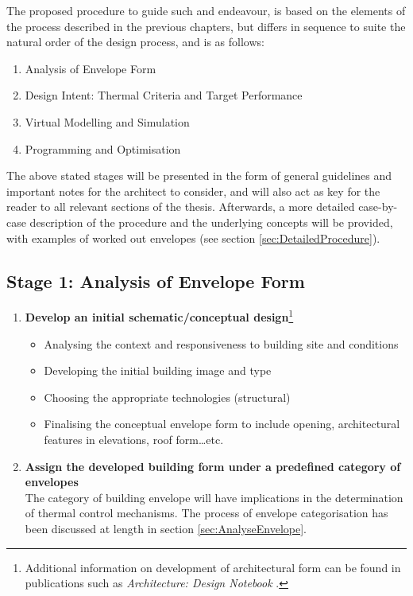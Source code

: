 The proposed procedure to guide such and endeavour, is based on the elements of the process described in the previous chapters, but differs in sequence to suite the natural order of the design process, and is as follows:

\begin{enumerate}
	\item Analysis of Envelope Form
	\item Design Intent: Thermal Criteria and Target Performance
	\item Virtual Modelling and Simulation
	\item Programming and Optimisation
\end{enumerate}

The above stated stages will be presented in the form of general guidelines and important notes for the architect to consider, and will also act as key for the reader to all relevant sections of the thesis. Afterwards, a more detailed case-by-case description of the procedure and the underlying concepts will be provided, with examples of worked out envelopes (see section \ref{sec:DetailedProcedure}).

\clearpage
\subsection{Stage 1: Analysis of Envelope Form}
\label{sec:Stage1}

\vspace{0.5cm}
\begin{enumerate}
	\item \textbf{Develop an initial schematic/conceptual design}\footnote{Additional information on development of architectural form can be found in publications such as \emph{Architecture: Design Notebook} \cite{fawcett03}.}
		\begin{itemize}
			\item Analysing the context and responsiveness to building site and conditions
			\item Developing the initial building image and type
			\item Choosing the appropriate technologies (structural)
			\item Finalising the conceptual envelope form to include opening, architectural features in elevations, roof form\ldots etc.
		\end{itemize}

		\vspace{0.3cm}
	\item \textbf{Assign the developed building form under a predefined category of envelopes}\\[3mm]
		The category of building envelope will have implications in the determination of thermal control mechanisms. The process of envelope categorisation has been discussed at length in section \ref{sec:AnalyseEnvelope}.
\end{enumerate}

